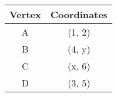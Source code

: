 
    \begin{tabular}{|c|c|}
        \hline
        \textbf{Vertex} & \textbf{Coordinates} \\
        \hline
        A & (1, 2) \\
        B & (4, y) \\
        C & (x, 6) \\
        D & (3, 5) \\
        \hline
    \end{tabular}


